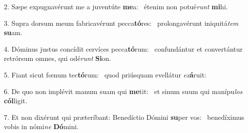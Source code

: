 2. Sæpe expugnavérunt me a juventúte \textbf{me}a: \ast\  étenim non potué\textit{runt} \textbf{mi}hi.\

3. Supra dorsum meum fabricavérunt pecca\textbf{tó}res: \ast\  prolongavérunt iniquitá\textit{tem} \textbf{su}am.\

4. Dóminus justus concídit cervíces pecca\textbf{tó}rum: \ast\  confundántur et convertántur retrórsum omnes, qui odé\textit{runt} \textbf{Si}on.\

5. Fiant sicut fœnum tec\textbf{tó}rum: \ast\  quod priúsquam evellátur \textit{ex}\textbf{á}ruit:\

6. De quo non implévit manum suam qui \textbf{me}tit: \ast\  et sinum suum qui manípu\textit{los} \textbf{cól}ligit.\

7. Et non dixérunt qui præteríbant: Benedíctio Dómini \textbf{su}per vos: \ast\  benedíximus vobis in nómi\textit{ne} \textbf{Dó}mini.\

